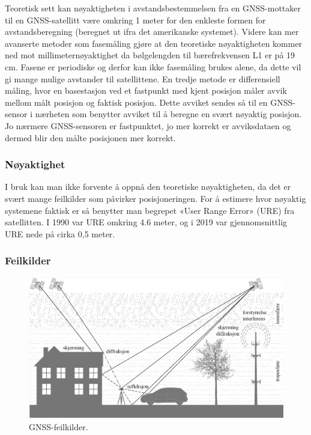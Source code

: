Teoretisk sett kan nøyaktigheten i avstandsbestemmelsen fra en GNSS-mottaker til en GNSS-satellitt være omkring 1 meter for den 
enkleste formen for avstandsberegning (beregnet ut ifra det amerikanske systemet). Videre kan mer avanserte metoder som 
fasemåling gjøre at den teoretiske nøyaktigheten kommer ned mot millimeternøyaktighet da bølgelengden til bærefrekvensen L1 er på 19 cm. 
Fasene er periodiske og derfor kan ikke fasemåling brukes alene, da dette vil gi mange mulige avstander til satellittene. 
En tredje metode er differensiell måling, hvor en basestasjon ved et fastpunkt med kjent posisjon måler avvik mellom 
målt posisjon og faktisk posisjon. Dette avviket sendes så til en GNSS-sensor i nærheten som benytter avviket til å beregne 
en svært nøyaktig posisjon. Jo nærmere GNSS-sensoren er fastpunktet, jo mer korrekt er avviksdataen og dermed blir den målte 
posisjonen mer korrekt. \parencite{ForsellGNSS}

\subsubsection{Nøyaktighet}
I bruk kan man ikke forvente å oppnå den teoretiske nøyaktigheten, da det er svært mange feilkilder som påvirker posisjoneringen. 
For å estimere hvor nøyaktig systemene faktisk er så benytter man begrepet «User Range Error» (URE) fra satellitten. 
I 1990 var URE omkring 4.6 meter, og i 2019 var gjennomsnittlig URE nede på cirka 0,5 meter. \parencite{ForsellGNSS}

\subsubsection{Feilkilder}

\begin{figure}[htp]
    \centering
    \includegraphics[width=1\columnwidth]{figures/gnss-feilkilder}
    \caption{GNSS-feilkilder.\parencite{NorskRomsenter}}
    \label{fig:gnss-feilkilder}
\end{figure}

